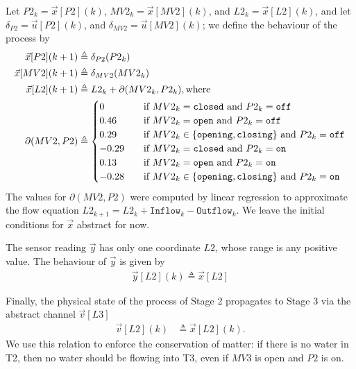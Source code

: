 {{%
Let $P2_k=\vec{x}[P2](k)$, $MV2_k=\vec{x}[MV2](k)$, and $L2_k=\vec{x}[L2](k)$, and let $\delta_{P2}=\vec{u}[P2](k)$, and $\delta_{MV2}=\vec{u}[MV2](k)$; we define the behaviour of the process by
\begin{align*}
\vec{x}[P2](k+1)&\triangleq \delta_{P2}(P2_k)\\
\vec{x}[MV2](k+1)&\triangleq \delta_{MV2}(MV2_k)\\
\vec{x}[L2](k+1)&\triangleq L2_k+\partial(MV2_k,P2_k),\text{where}\\
\partial(MV2,P2)&\triangleq
\begin{cases}
  0&\quad \text{if $MV2_k=\texttt{closed}$ and $P2_k=\texttt{off}$}\\
  0.46&\quad \text{if $MV2_k=\texttt{open}$ and $P2_k=\texttt{off}$}\\
  0.29&\quad \text{if $MV2_k\in\left\{\texttt{opening},\texttt{closing}\right\}$ and $P2_k=\texttt{off}$}\\
  -0.29&\quad \text{if $MV2_k=\texttt{closed}$ and $P2_k=\texttt{on}$}\\
  0.13&\quad \text{if $MV2_k=\texttt{open}$ and $P2_k=\texttt{on}$}\\
  -0.28&\quad \text{if $MV2_k\in\left\{\texttt{opening},\texttt{closing}\right\}$ and $P2_k=\texttt{on}$}\\  
\end{cases}
\end{align*}
The values for $\partial(MV2,P2)$ were computed by linear regression to approximate the flow equation $L2_{k+1}=L2_{k}+\texttt{Inflow}_k-\texttt{Outflow}_k$. We leave the initial conditions for $\vec{x}$ abstract for now. 

The sensor reading $\vec{y}$ has only one coordinate $L2$, whose range is any positive value. The behaviour of $\vec{y}$ is given by 
\begin{align}
  \vec{y}[L2](k)\triangleq\vec{x}[L2]
\end{align}

Finally, the physical state of the process of Stage 2 propagates to Stage 3 via the abstract channel $\vec{v}[L3]$
\begin{align}
  \vec{v}[L2](k)&\triangleq \vec{x}[L2](k).
\end{align}
We use this relation to enforce the conservation of matter: if there is no water in T2, then no water should be flowing into T3, even if $MV3$ is open and $P2$ is on. 

}}
